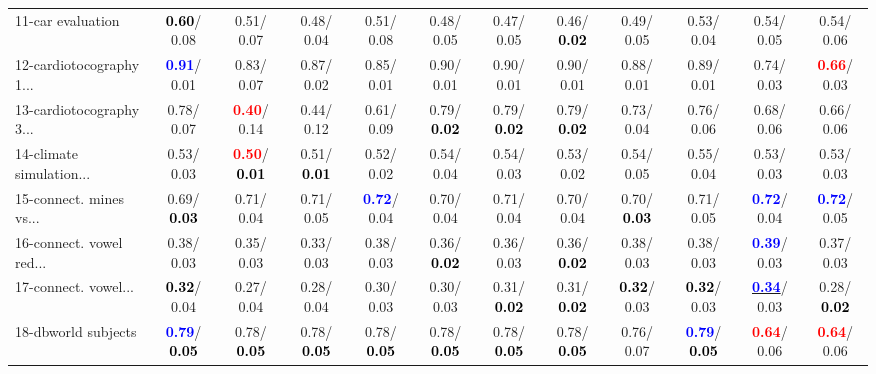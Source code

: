 \begin{table}[h]
\begin{center}
{\begin{tabular}{lc|c|c|c|c|c|c|c|c|c|c}
11-car evaluation & \textcolor{black}{\textbf{  0.60}}/  0.08 &   0.51/  0.07 &   0.48/  0.04 &   0.51/  0.08 &   0.48/  0.05 &   0.47/  0.05 &   0.46/\textcolor{black}{\textbf{  0.02}} &   0.49/  0.05 &   0.53/  0.04 &   0.54/  0.05 &   0.54/  0.06 \\
12-cardiotocography 1... & \textcolor{blue}{\textbf{  0.91}}/  0.01 &   0.83/  0.07 &   0.87/  0.02 &   0.85/  0.01 &   0.90/  0.01 &   0.90/  0.01 &   0.90/  0.01 &   0.88/  0.01 &   0.89/  0.01 &   0.74/  0.03 & \textcolor{red}{\textbf{  0.66}}/  0.03 \\
13-cardiotocography 3... &   0.78/  0.07 & \textcolor{red}{\textbf{  0.40}}/  0.14 &   0.44/  0.12 &   0.61/  0.09 &   0.79/\textcolor{black}{\textbf{  0.02}} &   0.79/\textcolor{black}{\textbf{  0.02}} &   0.79/\textcolor{black}{\textbf{  0.02}} &   0.73/  0.04 &   0.76/  0.06 &   0.68/  0.06 &   0.66/  0.06 \\
14-climate simulation... &   0.53/  0.03 & \textcolor{red}{\textbf{  0.50}}/\textcolor{black}{\textbf{  0.01}} &   0.51/\textcolor{black}{\textbf{  0.01}} &   0.52/  0.02 &   0.54/  0.04 &   0.54/  0.03 &   0.53/  0.02 &   0.54/  0.05 &   0.55/  0.04 &   0.53/  0.03 &   0.53/  0.03 \\ \hline
15-connect. mines vs... &   0.69/\textcolor{black}{\textbf{  0.03}} &   0.71/  0.04 &   0.71/  0.05 & \textcolor{blue}{\textbf{  0.72}}/  0.04 &   0.70/  0.04 &   0.71/  0.04 &   0.70/  0.04 &   0.70/\textcolor{black}{\textbf{  0.03}} &   0.71/  0.05 & \textcolor{blue}{\textbf{  0.72}}/  0.04 & \textcolor{blue}{\textbf{  0.72}}/  0.05 \\
16-connect. vowel red... &   0.38/  0.03 &   0.35/  0.03 &   0.33/  0.03 &   0.38/  0.03 &   0.36/\textcolor{black}{\textbf{  0.02}} &   0.36/  0.03 &   0.36/\textcolor{black}{\textbf{  0.02}} &   0.38/  0.03 &   0.38/  0.03 & \textcolor{blue}{\textbf{  0.39}}/  0.03 &   0.37/  0.03 \\
17-connect. vowel... & \textcolor{black}{\textbf{  0.32}}/  0.04 &   0.27/  0.04 &   0.28/  0.04 &   0.30/  0.03 &   0.30/  0.03 &   0.31/\textcolor{black}{\textbf{  0.02}} &   0.31/\textcolor{black}{\textbf{  0.02}} & \textcolor{black}{\textbf{  0.32}}/  0.03 & \textcolor{black}{\textbf{  0.32}}/  0.03 & \underline{\textcolor{blue}{\textbf{  0.34}}}/  0.03 &   0.28/\textcolor{black}{\textbf{  0.02}} \\
18-dbworld subjects & \textcolor{blue}{\textbf{  0.79}}/\textcolor{black}{\textbf{  0.05}} &   0.78/\textcolor{black}{\textbf{  0.05}} &   0.78/\textcolor{black}{\textbf{  0.05}} &   0.78/\textcolor{black}{\textbf{  0.05}} &   0.78/\textcolor{black}{\textbf{  0.05}} &   0.78/\textcolor{black}{\textbf{  0.05}} &   0.78/\textcolor{black}{\textbf{  0.05}} &   0.76/  0.07 & \textcolor{blue}{\textbf{  0.79}}/\textcolor{black}{\textbf{  0.05}} & \textcolor{red}{\textbf{  0.64}}/  0.06 & \textcolor{red}{\textbf{  0.64}}/  0.06 \\

\end{tabular}}
\end{center}
\end{table}

